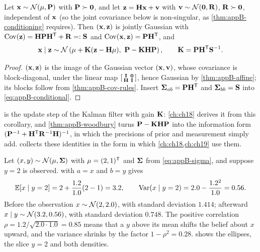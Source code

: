 \begin{corollary}
\label{thm:appB-linear-update}
Let $\mathbf{x} \sim \mathcal{N}(\mathbf{\mu}, \mathbf{P})$ with $\mathbf{P} \succ \mathbf{0}$, and let $\mathbf{z} = \mathbf{H}\mathbf{x} + \mathbf{v}$ with $\mathbf{v} \sim \mathcal{N}(\mathbf{0}, \mathbf{R})$, $\mathbf{R} \succ \mathbf{0}$, independent of $\mathbf{x}$ (so the joint covariance below is non-singular, as \cref{thm:appB-conditioning} requires). Then $(\mathbf{x}, \mathbf{z})$ is jointly Gaussian with $\operatorname{Cov}(\mathbf{z}) = \mathbf{H}\mathbf{P}\mathbf{H}^{\mathsf{T}} + \mathbf{R} =: \mathbf{S}$ and $\operatorname{Cov}(\mathbf{x}, \mathbf{z}) = \mathbf{P}\mathbf{H}^{\mathsf{T}}$, and
\begin{equation}
  \mathbf{x} \mid \mathbf{z} \sim \mathcal{N}\left(\mathbf{\mu} + \mathbf{K}(\mathbf{z} - \mathbf{H}\mathbf{\mu}),\ \mathbf{P} - \mathbf{K}\mathbf{H}\mathbf{P}\right),\qquad \mathbf{K} = \mathbf{P}\mathbf{H}^{\mathsf{T}}\mathbf{S}^{-1} .
  \label{eq:appB-kalman-update}
\end{equation}
\end{corollary}
\begin{proof}
$(\mathbf{x}, \mathbf{z})$ is the image of the Gaussian vector $(\mathbf{x}, \mathbf{v})$, whose covariance is block-diagonal, under the linear map $\begin{bsmallmatrix}\mathbf{I} & \mathbf{0}\\ \mathbf{H} & \mathbf{I}\end{bsmallmatrix}$, hence Gaussian by \cref{thm:appB-affine}; its blocks follow from \cref{thm:appB-cov-rules}. Insert $\mathbf{\Sigma}_{ab} = \mathbf{P}\mathbf{H}^{\mathsf{T}}$ and $\mathbf{\Sigma}_{bb} = \mathbf{S}$ into \cref{eq:appB-conditional}. \qedhere
\end{proof}

 is the update step of the Kalman filter with
gain $\mathbf{K}$: \cref{ch:ch18} derives it from this corollary, and
\cref{thm:appB-woodbury} turns $\mathbf{P} - \mathbf{K}\mathbf{H}\mathbf{P}$ into the
information form $(\mathbf{P}^{-1} + \mathbf{H}^{\mathsf{T}}\mathbf{R}^{-1}\mathbf{H})^{-1}$, in which
the precisions of prior and measurement simply add.
 collects these identities in the form in which
\cref{ch:ch18,ch:ch19} use them.

\begin{example}
\label{ex:appB-conditioning}
Let $(x, y) \sim \mathcal{N}(\mathbf{\mu}, \mathbf{\Sigma})$ with $\mathbf{\mu} = (2, 1)^{\mathsf{T}}$ and $\mathbf{\Sigma}$ from \cref{eq:appB-sigma}, and suppose $y = 2$ is observed.  with $a = x$ and $b = y$ gives
\begin{equation*}
  \mathbb{E}[x \mid y = 2] = 2 + \frac{1.2}{1.0}(2 - 1) = 3.2,\qquad
  \operatorname{Var}(x \mid y = 2) = 2.0 - \frac{1.2^2}{1.0} = 0.56 .
\end{equation*}
Before the observation $x \sim \mathcal{N}(2, 2.0)$, with standard deviation $1.414$; afterward $x \mid y \sim \mathcal{N}(3.2, 0.56)$, with standard deviation $0.748$. The positive correlation $\rho = 1.2/\sqrt{2.0 \cdot 1.0} = 0.85$ means that a $y$ above its mean shifts the belief about $x$ upward, and the variance shrinks by the factor $1 - \rho^2 = 0.28$.  shows the ellipses, the slice $y = 2$ and both densities.
\end{example}

